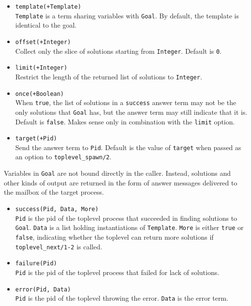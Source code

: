 \begin{itemize}
\item
  \texttt{template(+Template)}\\
  \texttt{Template} is a term sharing variables with \texttt{Goal}. By
  default, the template is identical to the goal.
\item
  \texttt{offset(+Integer)}\\
  Collect only the slice of solutions starting from \texttt{Integer}. Default
  is \texttt{0}.
\item
  \texttt{limit(+Integer)}\\
  Restrict the length of the returned list of solutions to \texttt{Integer}.
\item
  \texttt{once(+Boolean)}\\
  When \texttt{true}, the list of solutions in a \texttt{success} answer term
  may not be the only solutions that \texttt{Goal} has, but the answer term may
  still indicate that it is. Default is \texttt{false}. Makes sense only in
  combination with the \texttt{limit} option.
\item
  \texttt{target(+Pid)}\\
  Send the answer term to \texttt{Pid}. Default is the value of
  \texttt{target} when passed as an option to \texttt{toplevel\_spawn/2}.
\end{itemize}

\noindent Variables in \texttt{Goal} are not bound directly in the caller.
Instead, solutions and other kinds of output are returned in the form of answer
messages delivered to the mailbox of the target process.

\begin{itemize}
\item
  \texttt{success(Pid, Data, More)}\\
  \texttt{Pid} is the pid of the toplevel process that succeeded in finding
  solutions to \texttt{Goal}. \texttt{Data} is a list holding instantiations of
  \texttt{Template}. \texttt{More} is either \texttt{true} or \texttt{false},
  indicating whether the toplevel can return more solutions if
  \texttt{toplevel\_next/1-2} is called.
\item
  \texttt{failure(Pid)}\\
  \texttt{Pid} is the pid of the toplevel process that failed for lack of
  solutions.
\item
  \texttt{error(Pid, Data)}\\
  \texttt{Pid} is the pid of the toplevel throwing the error.
  \texttt{Data} is the error term.
\end{itemize}


